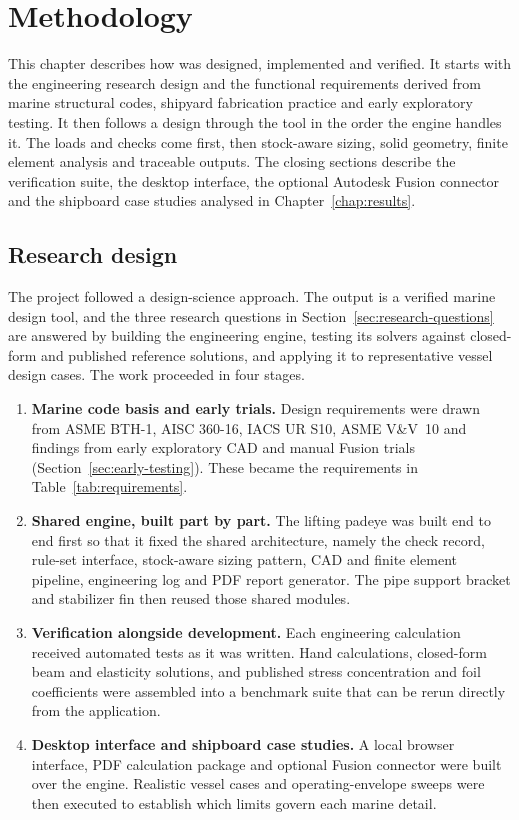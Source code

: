 \chapter{Methodology}
\label{chap:methodology}

This chapter describes how \NEMO{} was designed, implemented and verified. It
starts with the engineering research design and the functional requirements
derived from marine structural codes, shipyard fabrication practice and early
exploratory testing. It then follows a design through the tool in the order the
engine handles it. The loads and checks come first, then stock-aware sizing,
solid geometry, finite element analysis and traceable outputs. The closing
sections describe the verification suite, the desktop interface, the optional
Autodesk Fusion connector and the shipboard case studies analysed in
Chapter~\ref{chap:results}.

\section{Research design}
\label{sec:research-design}

The project followed a design-science approach. The output is a verified marine
design tool, and the three research questions in
Section~\ref{sec:research-questions} are answered by building the engineering
engine, testing its solvers against closed-form and published reference
solutions, and applying it to representative vessel design cases. The work
proceeded in four stages.

\begin{enumerate}
    \item \textbf{Marine code basis and early trials.} Design requirements were
    drawn from ASME BTH-1, AISC 360-16, IACS UR S10, ASME V\&V~10 and findings
    from early exploratory CAD and manual Fusion trials
    (Section~\ref{sec:early-testing}). These became the requirements in
    Table~\ref{tab:requirements}.
    \item \textbf{Shared engine, built part by part.} The lifting padeye was
    built end to end first so that it fixed the shared architecture, namely the
    check record, rule-set interface, stock-aware sizing pattern, CAD and
    finite element pipeline, engineering log and PDF report generator. The pipe
    support bracket and stabilizer fin then reused those shared modules.
    \item \textbf{Verification alongside development.} Each engineering
    calculation received automated tests as it was written. Hand calculations,
    closed-form beam and elasticity solutions, and published stress
    concentration and foil coefficients were assembled into a benchmark suite
    that can be rerun directly from the application.
    \item \textbf{Desktop interface and shipboard case studies.} A local
    browser interface, PDF calculation package and optional Fusion connector
    were built over the engine. Realistic vessel cases and operating-envelope
    sweeps were then executed to establish which limits govern each marine
    detail.
\end{enumerate}

